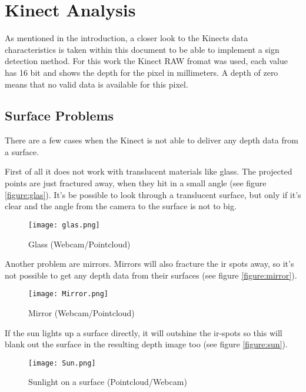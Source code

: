 \chapter{Kinect Analysis}
\graphicspath{{./KinectData/img/}}

As mentioned in the introduction, a closer look to the Kinects data characteristics is taken
within this document to be able to implement a sign detection method. 
For this work the Kinect RAW fromat was used, each value has 16 bit and shows the
depth for the pixel in millimeters. A depth of zero means that no valid data is available for
this pixel.

\section{Surface Problems}

There are a few cases when the Kinect is not able to deliver any depth data from a surface.

First of all it does not work with translucent materials like glass. The projected
points are just fractured away, when they hit in a small angle (see figure \vref{figure:glas}). 
It's be possible to look through a translucent surface, but only if it's clear and the angle from the 
camera to the surface is not to big.
\begin{figure}[htp]
\begin{center}
  \texttt{[image: glas.png]} 
  \caption{Glass (Webcam/Pointcloud)}
  \label{figure:glas}
\end{center}
\end{figure}
 
Another problem are mirrors. Mirrors will also fracture the ir spots away, 
so it's not possible to get any depth data from their surfaces (see figure \vref{figure:mirror}).
\begin{figure}[htp]
\begin{center}
  \texttt{[image: Mirror.png]}
  \caption{Mirror (Webcam/Pointcloud)}
  \label{figure:mirror}
\end{center}
\end{figure}

If the sun lights up a surface directly, it will outshine the ir-spots so this will blank out the surface
in the resulting depth image too (see figure \vref{figure:sun}).
\begin{figure}[htp]
\begin{center}
  \texttt{[image: Sun.png]}
  \caption{Sunlight on a surface (Pointcloud/Webcam)}
  \label{figure:sun}
\end{center}
\end{figure}

